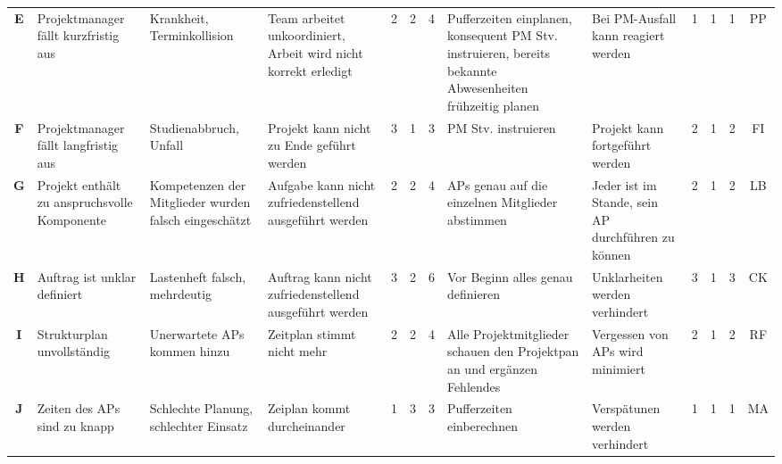 \begin{table}[H]
{\begin{tabular}{c|>{\HY\RaggedRight}p{2.5cm}|>{\HY\RaggedRight}p{2.5cm}|>{\HY\RaggedRight}p{2.5cm}|c|c|c|>{\HY\RaggedRight}p{3cm}|>{\HY\RaggedRight}p{3cm}|c|c|c|c}
\textbf{E}			&Projektmanager fällt kurzfristig aus			&Krankheit, Terminkollision															&Team arbeitet unkoordiniert, Arbeit wird nicht korrekt erledigt	&2			&2			&\cellcolor{dgelb}4				&Pufferzeiten einplanen, konsequent PM Stv. instruieren, bereits bekannte Abwesenheiten frühzeitig planen	&Bei PM-Ausfall kann reagiert werden																			&1				&1				&\cellcolor{dgruen}1		&PP\\
\rowcolor{grau}
\textbf{F}			&Projektmanager fällt langfristig aus			&Studienabbruch, Unfall																&Projekt kann nicht zu Ende geführt werden						&3			&1			&\cellcolor{hgelb}3				&PM Stv. instruieren																						&Projekt kann fortgeführt werden																				&2				&1				&\cellcolor{hgruen}2		&FI\\

\textbf{G}			&Projekt enthält zu anspruchsvolle Komponente		&Kompetenzen der Mitglieder wurden falsch eingeschätzt								&Aufgabe kann nicht zufriedenstellend ausgeführt werden			&2			&2			&\cellcolor{dgelb}4				&APs genau auf die einzelnen Mitglieder abstimmen															&Jeder ist im Stande, sein AP durchführen zu können															&2				&1				&\cellcolor{hgruen}2		&LB\\
\rowcolor{grau}
\textbf{H}			&Auftrag ist unklar definiert					&Lastenheft falsch, mehrdeutig														&Auftrag kann nicht zufriedenstellend ausgeführt werden			&3			&2			&\cellcolor{orange}6				&Vor Beginn alles genau definieren																		&Unklarheiten werden verhindert																				&3				&1				&\cellcolor{hgelb}3		&CK\\

\textbf{I}			&Strukturplan unvollständig						&Unerwartete APs kommen hinzu														&Zeitplan stimmt nicht mehr										&2			&2			&\cellcolor{dgelb}4				&Alle Projektmitglieder schauen den Projektpan an und ergänzen Fehlendes									&Vergessen von APs wird minimiert																			&2				&1				&\cellcolor{hgruen}2		&RF\\
\rowcolor{grau}
\textbf{J}			&Zeiten des APs sind zu knapp					&Schlechte Planung, schlechter Einsatz												&Zeiplan kommt durcheinander										&1			&3			&\cellcolor{hgelb}3				&Pufferzeiten einberechnen																				&Verspätunen werden verhindert																				&1				&1				&\cellcolor{dgruen}1		&MA\\


\end{tabular}}
\end{table}
